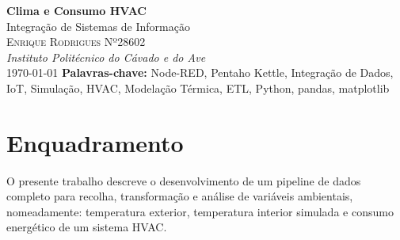 \documentclass[a4paper, 12pt]{article} %
\renewcommand{\maketitle}{
\begin{titlepage}
\begin{center}
\vspace*{1cm}
{\Huge\textbf{Clima e Consumo HVAC}}\\[0.5cm] %
{\Large Integração de Sistemas de Informação}\\[2cm] %
{\large \textsc{
	Enrique Rodrigues Nº28602}}\\[0.5cm] %
{\textit{Instituto Politécnico do Cávado e do Ave}}\\[1.5cm] %
{\large \today} %
\vfill
\textbf{Palavras-chave:} Node-RED, Pentaho Kettle, Integração de Dados, IoT, Simulação, HVAC, Modelação Térmica, ETL, Python, pandas, matplotlib
\end{center}
\end{titlepage}
}
\begin{document}
\maketitle %


\renewcommand{\abstractname}{Summary} %





\newpage
\renewcommand{\contentsname}{Índice}
\tableofcontents




\newpage
\section{Enquadramento}

O presente trabalho descreve o desenvolvimento de um pipeline de dados completo para recolha, transformação e análise de variáveis ambientais, nomeadamente:
temperatura exterior, temperatura interior simulada e consumo energético de um sistema HVAC.
\end{document}
